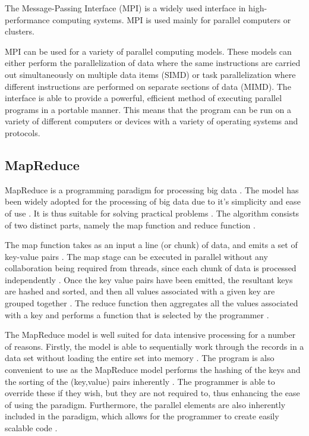 \documentclass[10pt,twocolumn]{witseiepaper}
\begin{document}
The Message-Passing Interface (MPI) is a widely used interface in high-performance computing systems. MPI is used mainly for parallel computers or clusters. 

MPI can be used for a variety of parallel computing models. These models can either perform the parallelization of data where the same instructions are carried out simultaneously on multiple data items (SIMD) or task parallelization where different instructions are performed on separate sections of data (MIMD)\cite{comparingMPIMapReduce}. The interface is able to provide a powerful, efficient method of executing parallel programs in a portable manner. This means that the program can be run on a variety of different computers or devices with a variety of operating systems and protocols.

\subsection{MapReduce}

MapReduce is a programming paradigm for processing big data \cite{comparingMPIMapReduce}. The model has been widely adopted for the processing of big data due to it's simplicity and ease of use \cite{comparingMPIMapReduce}. It is thus suitable for solving practical problems \cite{comparingMPIMapReduce, mapReduceJoin}. The algorithm consists of two distinct parts, namely the map function and reduce function \cite{phoenix}. 

The map function takes as an input a line (or chunk) of data, and emits a set of key-value pairs \cite{phoenix}. The map stage can be executed in parallel without any collaboration being required from threads, since each chunk of data is processed independently \cite{comparingMPIMapReduce}. Once the key value pairs have been emitted, the resultant keys are hashed and sorted, and then all values associated with a given key are grouped together \cite{phoenix}. The reduce function then aggregates all the values associated with a key and performs a function that is selected by the programmer \cite{comparingMPIMapReduce}.

The MapReduce model is well suited for data intensive processing for a number of reasons. Firstly, the model is able to sequentially work through the records in a data set without loading the entire set into memory \cite{comparingMPIMapReduce}. The program is also convenient to use as the MapReduce model performs the hashing of the keys and the sorting of the (key,value) pairs inherently \cite{phoenix}. The programmer is able to override these if they wish, but they are not required to, thus enhancing the ease of using the paradigm. Furthermore, the parallel elements are also inherently included in the paradigm, which allows for the programmer to create easily scalable code \cite{comparingMPIMapReduce}. 
\end{document}

